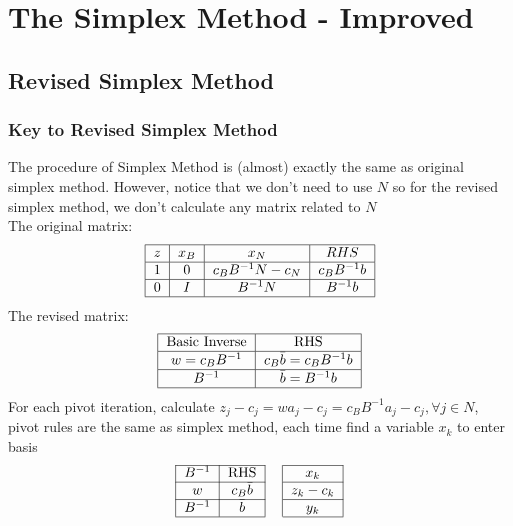 		\chapter{The Simplex Method - Improved}
			\section{Revised Simplex Method}
				\subsection{Key to Revised Simplex Method}
					The procedure of Simplex Method is (almost) exactly the same as original simplex method. However, notice that we don't need to use $N$ so for the revised simplex method, we don't calculate any matrix related to $N$\\
					The original matrix:
					\begin{align}
						\begin{tabular} {|c|c|c|c|}
							\hline
							$z$ & $x_B$ & $x_N$ & $RHS$ \\
							\hline
							1 & 0 & $c_BB^{-1}N - c_N$ & $c_BB^{-1}b$ \\
							\hline
							0 & $I$ & $B^{-1}N$ & $B^{-1}b$ \\
							\hline
						\end{tabular} 
					\end{align}
					The revised matrix:
					\begin{align}
						\begin{tabular} {|c|c|}
							\hline
							Basic Inverse & RHS \\
							\hline
							$w=c_BB^{-1}$ & $c_B\bar{b} = c_BB^{-1}b$\\
							\hline
							$B^{-1}$ & $\bar{b} = B^{-1}b$\\
							\hline
						\end{tabular} 
					\end{align}
					For each pivot iteration, calculate $z_j - c_j = wa_j - c_j = c_BB^{-1}a_j - c_j, \forall j\in N$, pivot rules are the same as simplex method, each time find a variable $x_k$ to enter basis
					\begin{align}
						\begin{tabular}{|c|c|c|c|}
							\cline{1-2} \cline{4-4} $B^{-1}$ & RHS & & $x_k$ \\
							\cline{1-2} \cline{4-4} $w$ & $c_B\bar{b}$ & & $z_k-c_k$ \\
							\cline{1-2} \cline{4-4} $B^{-1}$ & $\bar{b}$ & & $y_k$ \\
							\cline{1-2} \cline{4-4}
						\end{tabular} 
					\end{align}
